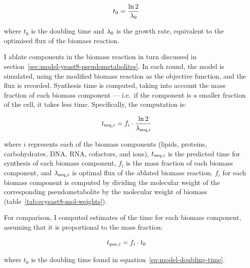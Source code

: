 \begin{equation}
  t_{0} = \frac{\ln 2}{\lambda_{0}}
  \label{eq:model-doubling-time}
\end{equation}

where $t_{0}$ is the doubling time and $\lambda_{0}$ is the growth rate, equivalent to the optimised flux of the biomass reaction.

I ablate components in the biomass reaction in turn discussed in section~\ref{sec:model-yeast8-pseudometabolites}.
In each round, the model is simulated, using the modified biomass reaction as the objective function, and the flux is recorded.
Synthesis time is computed, taking into account the mass fraction of each biomass component --- i.e.\ if the component is a smaller fraction of the cell, it takes less time.
Specifically, the computation is:

\begin{equation}
  t_{\mathrm{seq},i} = f_{i} \cdot \frac{\ln 2}{\lambda_{\mathrm{seq},i}}
  \label{eq:model-ablated-time}
\end{equation}

where $i$ represents each of the biomass components (lipids, proteins, carbohydrates, DNA, RNA, cofactors, and ions), $t_{\mathrm{seq},i}$ is the predicted time for synthesis of each biomass component, $f_{i}$ is the mass fraction of each biomass component, and $\lambda_{\mathrm{seq},i}$ is optimal flux of the ablated biomass reaction.
$f_{i}$ for each biomass component is computed by dividing the molecular weight of the corresponding pseudometabolite by the molecular weight of biomass (table~\ref{tab:ecyeast8-mol-weights}).

For comparison, I computed estimates of the time for each biomass component, assuming that it is proportional to the mass fraction:

\begin{equation}
  t_{\mathrm{par},i} = f_{i} \cdot t_{0}
  \label{eq:model-proportional-time}
\end{equation}

where $t_{0}$ is the doubling time found in equation~\ref{eq:model-doubling-time}.

